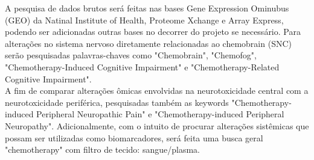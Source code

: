 \documentclass[12pt,a4paper]{article}
\begin{document}
A pesquisa de dados brutos será feitas nas bases Gene Expression Ominubus (GEO) da Natinal Institute of Health, Proteome Xchange e Array Express, podendo ser adicionadas outras bases no decorrer do projeto se necessário. Para alterações no sistema nervoso diretamente relacionadas ao chemobrain (SNC) serão pesquisadas palavras-chaves como "Chemobrain", "Chemofog", "Chemotherapy-Induced Cognitive Impairment" e "Chemotherapy-Related Cognitive Impairment". \\
	
A fim de comparar alterações ômicas envolvidas na neurotoxicidade central com a neurotoxicidade periférica, pesquisadas também as keywords "Chemotherapy-induced Peripheral Neuropathic Pain" e "Chemotherapy-induced Peripheral Neuropathy". Adicionalmente, com o intuito de procurar alterações sistêmicas que possam ser utilizadas como biomarcadores, será feita uma busca geral "chemotherapy" com filtro de tecido: sangue/plasma. \\
	
\end{document}
